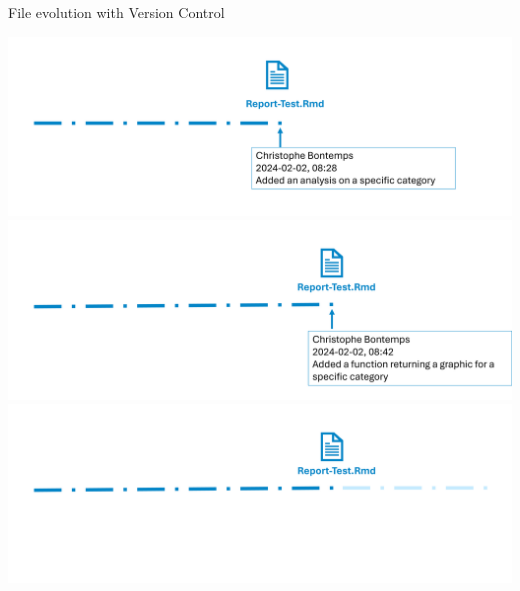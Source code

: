 \documentclass[xcolor=x11names,compress, aspectratio=169]{beamer}
\renewcommand{\(}{\begin{columns}}
\renewcommand{\)}{\end{columns}}
\newcommand{\<}[1]{\begin{column}{#1}}
\renewcommand{\>}{\end{column}}
\begin{document}
\begin{frame}{File evolution  \textcolor{brique}{with Version Control}  }
\begin{center}
\begin{itemize}
    {\includegraphics[width = 1.0\textwidth]{FileLife5.png} \\ }
    {\includegraphics[width = 1.0\textwidth]{FileLife6.png} \\ }
    {\includegraphics[width = 1.0\textwidth]{FileLife7.png} \\ }
\end{itemize}
\end{center}
\end{frame}
\end{document}

